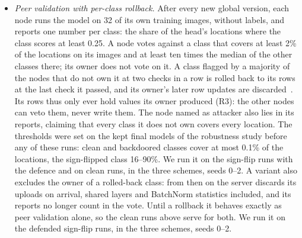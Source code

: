 \documentclass[pdflatex,sn-mathphys-num]{sn-jnl}
\begin{document}
\begin{itemize}
\item \emph{Peer validation with per-class rollback.} After every new global version, each node runs the model on 32 of its own training images, without labels, and reports one number per class: the share of the head's locations where the class scores at least 0.25. A node votes against a class that covers at least 2\% of the locations on its images and at least ten times the median of the other classes there; its owner does not vote on it. A class flagged by a majority of the nodes that do not own it at two checks in a row is rolled back to its rows at the last check it passed, and its owner's later row updates are discarded~\cite{andreina2021baffle}. Its rows thus only ever hold values its owner produced (R3): the other nodes can veto them, never write them. The node named as attacker also lies in its reports, claiming that every class it does not own covers every location. The thresholds were set on the kept final models of the robustness study before any of these runs: clean and backdoored classes cover at most 0.1\% of the locations, the sign-flipped class 16--90\%. We run it on the sign-flip runs with the defence and on clean runs, in the three schemes, seeds 0--2. A variant also excludes the owner of a rolled-back class: from then on the server discards its uploads on arrival, shared layers and BatchNorm statistics included, and its reports no longer count in the vote. Until a rollback it behaves exactly as peer validation alone, so the clean runs above serve for both. We run it on the defended sign-flip runs, in the three schemes, seeds 0--2.
\end{itemize}
\end{document}
